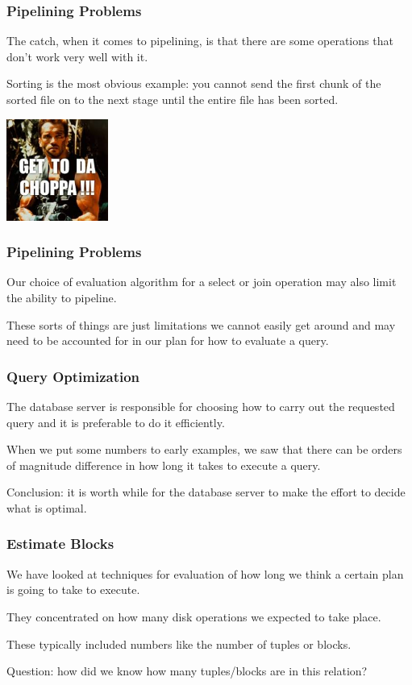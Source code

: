 \begin{frame}
\frametitle{Pipelining Problems}

The catch, when it comes to pipelining, is that there are some operations that don't work very well with it. 

Sorting is the most obvious example: you cannot send the first chunk of the sorted file on to the next stage until the entire file has been sorted. 

\begin{center}
	\includegraphics[width=0.25\textwidth]{images/choppa.jpg}
\end{center}

\end{frame}

\begin{frame}
\frametitle{Pipelining Problems}

Our choice of evaluation algorithm for a select or join operation may also limit the ability to pipeline. 

These sorts of things are just limitations we cannot easily get around and may need to be accounted for in our plan for how to evaluate a query.


\end{frame}

\begin{frame}
\frametitle{Query Optimization}

The database server is responsible for choosing how to carry out the requested query and it is preferable to do it efficiently.

When we put some numbers to early examples, we saw that there can be orders of magnitude difference in how long it takes to execute a query. 

Conclusion: it is worth while for the database server to make the effort to decide what is optimal.


\end{frame}

\begin{frame}
\frametitle{Estimate Blocks}

We have looked at techniques for evaluation of how long we think a certain plan is going to take to execute.

They concentrated on how many disk operations we expected to take place. 

These typically included numbers like the number of tuples or blocks.

Question: how did we know how many tuples/blocks are in this relation?

\end{frame}


